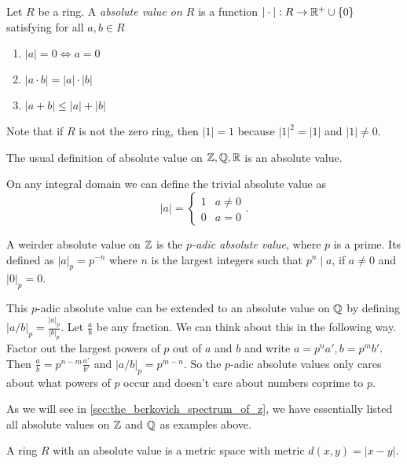\begin{definition}
	Let $R$ be a ring. A \emph{absolute value on $R$} is a function
	$|\cdot |: R \to \mathbb{R}^{+} \cup \{0\} $ satisfying for all $a, b \in R$
	\begin{enumerate}
		\item $|a| = 0 \iff a = 0$ 
		\item $|a \cdot b| = |a| \cdot |b|$ 
		\item $|a + b| \le |a| + |b|$
	\end{enumerate}
\end{definition}
Note that if $R$ is not the zero ring, then $|1| = 1$ because $|1|^2 = |1| $ and $|1|\ne 0 $. 
\begin{example}
	The usual definition of absolute value on $\mathbb{Z}, \mathbb{Q}, \mathbb{R}$ is an absolute value. 
\end{example}
\begin{example}
	On any integral domain we can define the trivial absolute value as \[
	 |a| = \begin{cases}
		 1 & a \ne 0 \\
		 0 & a = 0
	 \end{cases}
	.\] 
\end{example}
\begin{example}
	A weirder absolute value on $\mathbb{Z}$ is the \emph{$p$-adic absolute value}, where $p$ is a prime. 
	Its defined as $|a|_p = p^{-n}$ where $n$ is the largest integers such that $p^{n} \mid a$, if $a \ne 0$ and $|0|_p = 0$. 


	This $p$-adic absolute value can be extended to an absolute value on $\mathbb{Q}$ by defining $|a / b|_p = \frac{|a|_p}{|b|_p}$. Let $\frac{a}{b}$ be any fraction. 
	We can think about this in the following way. 
	Factor out the largest powers of $p$ out of $a$ and $b$ and write $a = p^{n} a', b = p^{m} b'$. Then $\frac{a}{ b} = p^{n - m} \frac{a'}{ b'}$ and $|a / b|_p = p^{m - n}$. 
	So the $p$-adic absolute values only cares about what powers of $p$ occur and doesn't care about numbers coprime to $p $.
\end{example}
As we will see in \cref{sec:the_berkovich_spectrum_of_z}, we have essentially listed all absolute values on $\mathbb{Z}$ and $\mathbb{Q}$ as examples above.  
\begin{observation}
	A ring $R$ with an absolute value is a metric space with metric $d(x, y) = |x - y|$. 
\end{observation}
